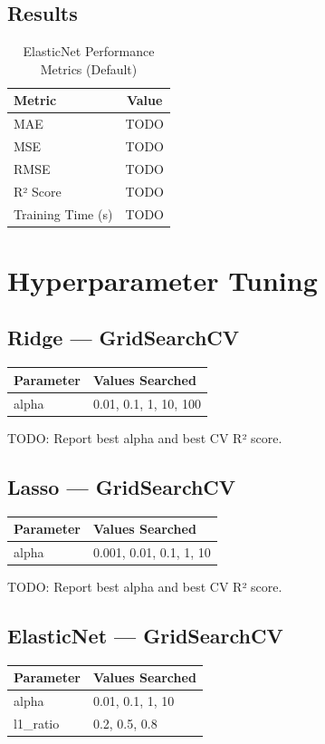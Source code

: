 \documentclass[12pt,a4paper]{article}
\begin{document}
\subsection{Results}
\begin{table}[H]
\centering
\begin{tabular}{lc}
\toprule
\textbf{Metric} & \textbf{Value} \\ \midrule
MAE & TODO \\
MSE & TODO \\
RMSE & TODO \\
R² Score & TODO \\
Training Time (s) & TODO \\
\bottomrule
\end{tabular}
\caption{ElasticNet Performance Metrics (Default)}
\end{table}

\section{Hyperparameter Tuning}
\subsection{Ridge — GridSearchCV}
\begin{longtable}{|l|l|}
\hline
\textbf{Parameter} & \textbf{Values Searched} \\ \hline
alpha & 0.01, 0.1, 1, 10, 100 \\ \hline
\end{longtable}

TODO: Report best alpha and best CV R² score.

\subsection{Lasso — GridSearchCV}
\begin{longtable}{|l|l|}
\hline
\textbf{Parameter} & \textbf{Values Searched} \\ \hline
alpha & 0.001, 0.01, 0.1, 1, 10 \\ \hline
\end{longtable}

TODO: Report best alpha and best CV R² score.

\subsection{ElasticNet — GridSearchCV}
\begin{longtable}{|l|l|}
\hline
\textbf{Parameter} & \textbf{Values Searched} \\ \hline
alpha & 0.01, 0.1, 1, 10 \\ \hline
l1\_ratio & 0.2, 0.5, 0.8 \\ \hline
\end{longtable}
\end{document}

